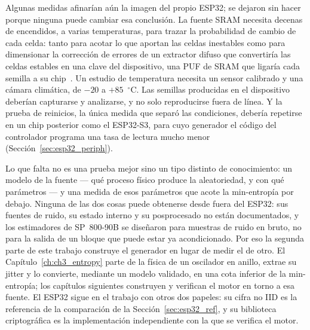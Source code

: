 Algunas medidas afinarían aún la imagen del propio ESP32; se dejaron sin
hacer porque ninguna puede cambiar esa conclusión. La fuente SRAM
necesita decenas de encendidos, a varias temperaturas, para trazar la
probabilidad de cambio de cada celda: tanto para acotar lo que aportan las
celdas inestables como para dimensionar la corrección de errores de un
extractor difuso que convertiría las celdas estables en una clave del
dispositivo, una \ac{PUF} de SRAM que ligaría cada semilla a su
chip~\cite{holcomb_2009_powerup}. Un estudio de temperatura necesita un
sensor calibrado y una cámara climática, de $-20$ a $+85$~$^\circ$C. Las
semillas producidas en el dispositivo deberían capturarse y analizarse, y
no solo reproducirse fuera de línea. Y la prueba de reinicios, la única
medida que separó las condiciones, debería repetirse en un chip posterior
como el ESP32-S3, para cuyo generador el código del controlador programa
una tasa de lectura mucho menor (Sección~\ref{sec:esp32_periph}).

Lo que falta no es una prueba mejor sino un tipo distinto de
conocimiento: un modelo de la fuente --- qué proceso físico produce la
aleatoriedad, y con qué parámetros --- y una medida de esos parámetros que
acote la min-entropía por debajo. Ninguna de las dos cosas puede
obtenerse desde fuera del ESP32: sus fuentes de ruido, su estado interno
y su posprocesado no están documentados, y los estimadores de
SP~800-90B se diseñaron para muestras de ruido en bruto, no para la
salida de un bloque que puede estar ya acondicionado. Por eso la segunda
parte de este trabajo construye el generador en lugar de medir el de
otro. El Capítulo~\ref{ch:ch3_entropy} parte de la física de un oscilador
en anillo, extrae su jitter y lo convierte, mediante un modelo validado,
en una cota inferior de la min-entropía; los capítulos siguientes
construyen y verifican el motor en torno a esa fuente. El ESP32 sigue en
el trabajo con otros dos papeles: su cifra no IID es la referencia de la
comparación de la Sección~\ref{sec:esp32_ref}, y su biblioteca
criptográfica es la implementación independiente con la que se verifica
el motor.
